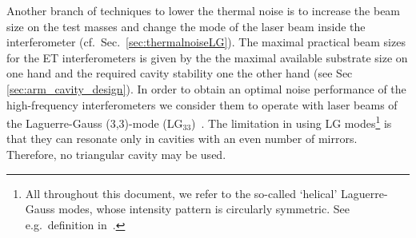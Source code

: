  Another branch of techniques 
to lower the thermal noise is to increase the beam size on the test masses and change the mode of the
laser beam inside the interferometer (cf.\ Sec.~\ref{sec:thermalnoiseLG}).
The maximal practical beam sizes for the ET interferometers is given by
the the maximal available substrate
size on one hand  and the required cavity stability  one the other hand (see Sec \ref{sec:arm_cavity_design}). 
In order to obtain an optimal noise performance of the high-frequency interferometers we consider them 
to operate with laser beams of the Laguerre-Gauss (3,3)-mode (LG$_{33}$)~\cite{Mours06, Vinet2007}.
The limitation in using LG modes\footnote{All throughout this document, we refer to the so-called `helical' Laguerre-Gauss modes, whose intensity pattern is circularly symmetric. See e.g.\ definition in~\cite{Mours06}.} is that they can resonate only in cavities with an even number of mirrors. Therefore, no triangular cavity may be used.


